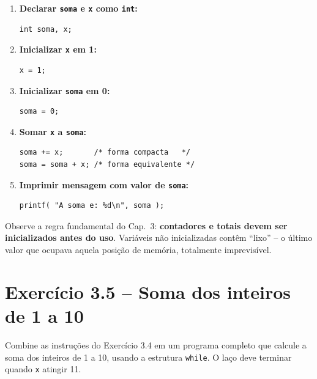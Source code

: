 \documentclass[12pt,a4paper]{article}
\begin{document}
\begin{respostabox}
\begin{enumerate}[label=\textbf{\alph*)}]

\item \textbf{Declarar \texttt{soma} e \texttt{x} como \texttt{int}:}
\begin{lstlisting}
int soma, x;
\end{lstlisting}

\item \textbf{Inicializar \texttt{x} em 1:}
\begin{lstlisting}
x = 1;
\end{lstlisting}

\item \textbf{Inicializar \texttt{soma} em 0:}
\begin{lstlisting}
soma = 0;
\end{lstlisting}

\item \textbf{Somar \texttt{x} a \texttt{soma}:}
\begin{lstlisting}
soma += x;       /* forma compacta   */
soma = soma + x; /* forma equivalente */
\end{lstlisting}

\item \textbf{Imprimir mensagem com valor de \texttt{soma}:}
\begin{lstlisting}
printf( "A soma e: %d\n", soma );
\end{lstlisting}

\end{enumerate}

\begin{boaprática}
  Observe a regra fundamental do Cap.~3: \textbf{contadores e totais devem ser
  inicializados antes do uso}. Variáveis não inicializadas contêm ``lixo'' --
  o último valor que ocupava aquela posição de memória, totalmente imprevisível.
\end{boaprática}
\end{respostabox}

\newpage

\section{Exercício 3.5 -- Soma dos inteiros de 1 a 10}

\begin{enunciadoBox}[Enunciado 3.5]
Combine as instruções do Exercício 3.4 em um programa completo que calcule a soma
dos inteiros de 1 a 10, usando a estrutura \texttt{while}. O laço deve terminar
quando \texttt{x} atingir 11.
\end{enunciadoBox}
\end{document}
